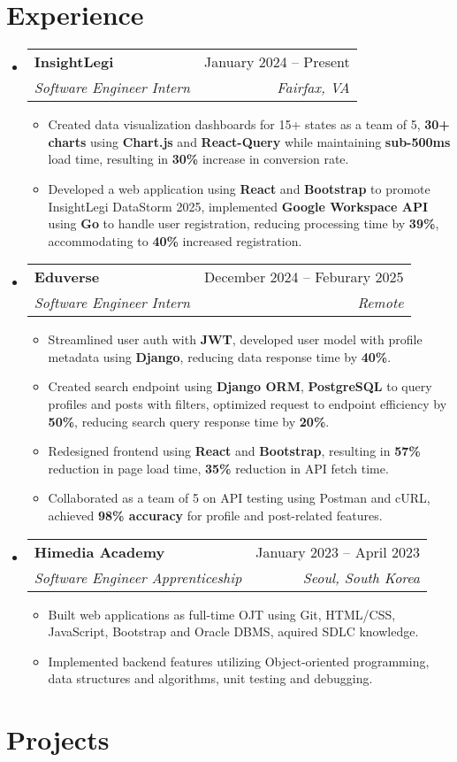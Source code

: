 \documentclass[letterpaper,11pt]{article}
\makeatletter
\newcommand{\resumeItem}[1]{
  \item\small{
    {#1 \vspace{0pt}}
  }
}
\newcommand{\resumeSubheading}[4]{
    \item
    \begin{tabular*}{0.985\textwidth}[t]{l@{\extracolsep{\fill}}r@{\hspace{-0.1in}}}
        \small{\textbf{#1}} & \small{#2} \\
        \textit{\small#3} & \textit{\small #4} \\
    \end{tabular*}\vspace{-6pt}
}
\newcommand{\resumeSubHeadingListStart}{\begin{itemize}[leftmargin=0.00in, rightmargin=-0.2in, label={}]\vspace{1pt}}
\newcommand{\resumeSubHeadingListEnd}{\end{itemize}\vspace{-10pt}}
\newcommand{\resumeItemListStart}{\begin{itemize}[leftmargin=0.15in, rightmargin=0.15in]}
\newcommand{\resumeItemListEnd}{\end{itemize}\vspace{-5pt}}
\makeatother
\begin{document}
\section{Experience}

\resumeSubHeadingListStart
\resumeSubheading
{InsightLegi} {January 2024 -- Present}
{Software Engineer Intern} {Fairfax, VA}
\resumeItemListStart 
\resumeItem{Created data visualization dashboards for 15+ states as a team of 5, \textbf{30+ charts} using \textbf{Chart.js} and \textbf{React-Query} while maintaining \textbf{sub-500ms} load time, resulting in \textbf{30\%} increase in conversion rate.}
\resumeItem{Developed a web application using \textbf{React} and \textbf{Bootstrap} to promote InsightLegi DataStorm 2025, implemented \textbf{Google Workspace API} using \textbf{Go} to handle user registration, reducing processing time by \textbf{39\%}, accommodating to \textbf{40\%} increased registration.}
\resumeItemListEnd
\resumeSubHeadingListEnd

\resumeSubHeadingListStart
\resumeSubheading
{Eduverse} {December 2024 -- Feburary 2025}
{Software Engineer Intern} {Remote}
\resumeItemListStart
\resumeItem{Streamlined user auth with \textbf{JWT}, developed user model with profile metadata using \textbf{Django}, reducing data response time by \textbf{40\%}.}
\resumeItem{Created search endpoint using \textbf{Django ORM}, \textbf{PostgreSQL} to query profiles and posts with filters, optimized request to endpoint efficiency by \textbf{50\%}, reducing search query response time by \textbf{20\%}.}
\resumeItem{Redesigned frontend using \textbf{React} and \textbf{Bootstrap}, resulting in \textbf{57\%} reduction in page load time, \textbf{35\%} reduction in API fetch time.}
\resumeItem{Collaborated as a team of 5 on API testing using Postman and cURL, achieved \textbf{98\% accuracy} for profile and post-related features.}
\resumeItemListEnd
\resumeSubHeadingListEnd

\resumeSubHeadingListStart
\resumeSubheading
{Himedia Academy} {January 2023 -- April 2023}
{Software Engineer Apprenticeship} {Seoul, South Korea}
\resumeItemListStart
\resumeItem{Built web applications as full-time OJT using Git, HTML/CSS, JavaScript, Bootstrap and Oracle DBMS, aquired SDLC knowledge.}
\resumeItem{Implemented backend features utilizing Object-oriented programming, data structures and algorithms, unit testing and debugging.}
\resumeItemListEnd
\resumeSubHeadingListEnd


\section{Projects}
\end{document}
